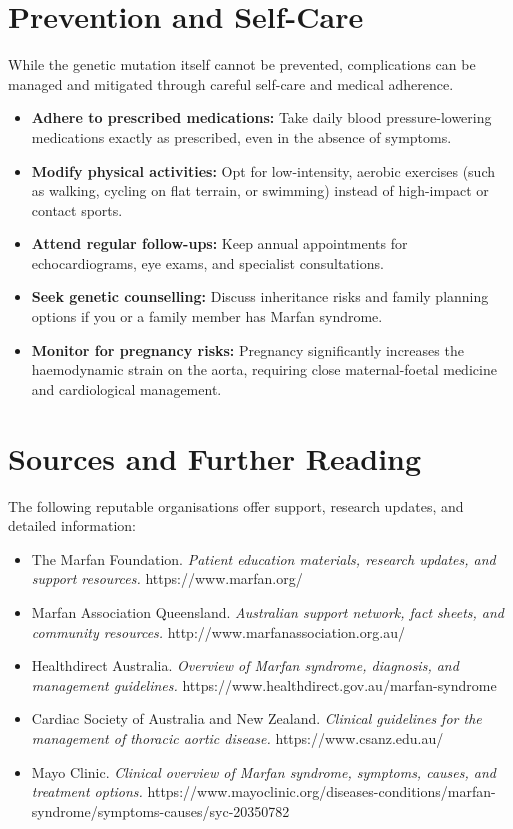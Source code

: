 \section*{Prevention and Self-Care}
While the genetic mutation itself cannot be prevented, complications can be managed and mitigated through careful self-care and medical adherence.
\begin{itemize}
    \item \textbf{Adhere to prescribed medications:} Take daily blood pressure-lowering medications exactly as prescribed, even in the absence of symptoms.
    \item \textbf{Modify physical activities:} Opt for low-intensity, aerobic exercises (such as walking, cycling on flat terrain, or swimming) instead of high-impact or contact sports.
    \item \textbf{Attend regular follow-ups:} Keep annual appointments for echocardiograms, eye exams, and specialist consultations.
    \item \textbf{Seek genetic counselling:} Discuss inheritance risks and family planning options if you or a family member has Marfan syndrome.
    \item \textbf{Monitor for pregnancy risks:} Pregnancy significantly increases the haemodynamic strain on the aorta, requiring close maternal-foetal medicine and cardiological management.
\end{itemize}

\section*{Sources and Further Reading}
The following reputable organisations offer support, research updates, and detailed information:
\begin{itemize}
    \item The Marfan Foundation. \textit{Patient education materials, research updates, and support resources.} https://www.marfan.org/
    \item Marfan Association Queensland. \textit{Australian support network, fact sheets, and community resources.} http://www.marfanassociation.org.au/
    \item Healthdirect Australia. \textit{Overview of Marfan syndrome, diagnosis, and management guidelines.} https://www.healthdirect.gov.au/marfan-syndrome
    \item Cardiac Society of Australia and New Zealand. \textit{Clinical guidelines for the management of thoracic aortic disease.} https://www.csanz.edu.au/
    \item Mayo Clinic. \textit{Clinical overview of Marfan syndrome, symptoms, causes, and treatment options.} https://www.mayoclinic.org/diseases-conditions/marfan-syndrome/symptoms-causes/syc-20350782
\end{itemize}
